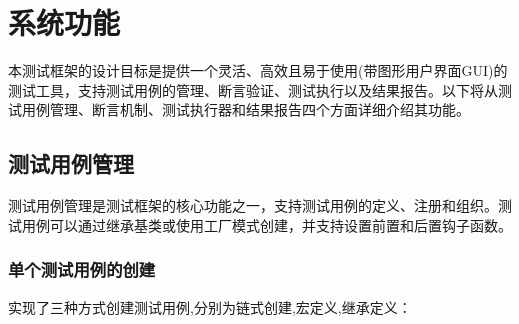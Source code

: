 \documentclass[chinese]{article}
\begin{document}
\section{系统功能}
本测试框架的设计目标是提供一个灵活、高效且易于使用(带图形用户界面GUI)的测试工具，支持测试用例的管理、断言验证、测试执行以及结果报告。以下将从测试用例管理、断言机制、测试执行器和结果报告四个方面详细介绍其功能。

\subsection{测试用例管理}
测试用例管理是测试框架的核心功能之一，支持测试用例的定义、注册和组织。测试用例可以通过继承基类或使用工厂模式创建，并支持设置前置和后置钩子函数。

\subsubsection{单个测试用例的创建}

实现了三种方式创建测试用例,分别为链式创建,宏定义,继承定义：
\end{document}
